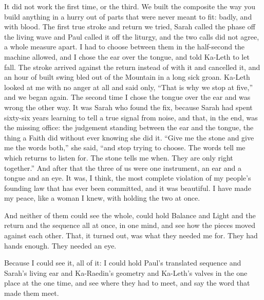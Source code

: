 It did not work the first time, or the third. We built the composite the way you build anything in a hurry out of parts that were never meant to fit: badly, and with blood. The first true stroke and return we tried, Sarah called the phase off the living wave and Paul called it off the liturgy, and the two calls did not agree, a whole measure apart. I had to choose between them in the half-second the machine allowed, and I chose the ear over the tongue, and told Ka-Leth to let fall. The stroke arrived against the return instead of with it and cancelled it, and an hour of built swing bled out of the Mountain in a long sick groan. Ka-Leth looked at me with no anger at all and said only, ``That is why we stop at five,'' and we began again. The second time I chose the tongue over the ear and was wrong the other way. It was Sarah who found the fix, because Sarah had spent sixty-six years learning to tell a true signal from noise, and that, in the end, was the missing office: the judgement standing between the ear and the tongue, the thing a Faith did without ever knowing she did it. ``Give me the stone and give me the words both,'' she said, ``and stop trying to choose. The words tell me which returns to listen for. The stone tells me when. They are only right together.'' And after that the three of us were one instrument, an ear and a tongue and an eye. It was, I think, the most complete violation of my people's founding law that has ever been committed, and it was beautiful. I have made my peace, like a woman I knew, with holding the two at once.\par

And neither of them could see the whole, could hold Balance and Light and the return and the sequence all at once, in one mind, and see how the pieces moved against each other. That, it turned out, was what they needed me for. They had hands enough. They needed an eye.\par

Because I could see it, all of it: I could hold Paul's translated sequence and Sarah's living ear and Ka-Raedin's geometry and Ka-Leth's valves in the one place at the one time, and see where they had to meet, and say the word that made them meet.\par

